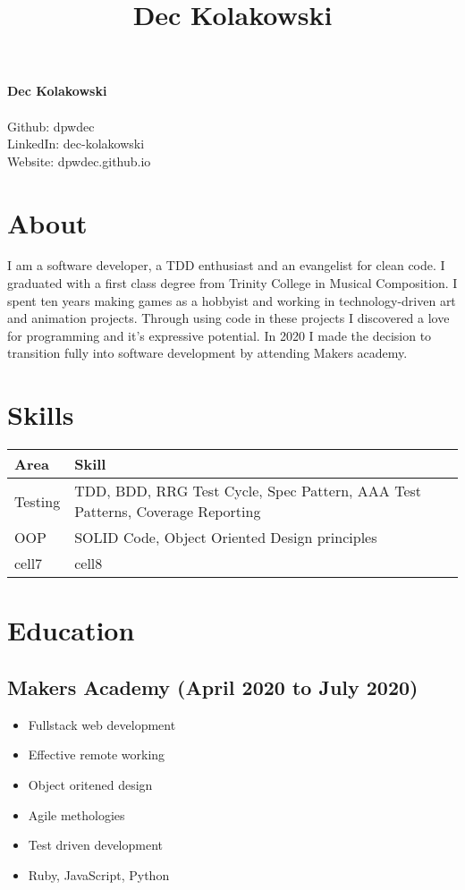 \documentclass[12pt]{IEEEtran}
\begin{document}
\LARGE
\noindent
\title{Dec Kolakowski}
\textbf{Dec Kolakowski}
\small
\\
\\
Github: dpwdec
\\
LinkedIn: dec-kolakowski
\\
Website: dpwdec.github.io
\\

\section*{About}

I am a software developer, a TDD enthusiast and an evangelist for clean code. I graduated with a first class degree from Trinity College in Musical Composition. I spent ten years making games as a hobbyist and working in technology-driven art and animation projects. Through using code in these projects I discovered a love for programming and it’s expressive potential. In 2020 I made the decision to transition fully into software development by attending Makers academy.

\section*{Skills}

\begin{center}
\begin{tabular}{ |l|l| } 
 \hline
 Area & Skill\\
 \hline\hline
 Testing & TDD, BDD, RRG Test Cycle, Spec Pattern, AAA Test Patterns, Coverage Reporting\\
 \hline
 OOP & SOLID Code, Object Oriented Design principles\\
 \hline
 cell7 & cell8\\
 \hline
\end{tabular}
\end{center}

\section*{Education}

\subsection*{Makers Academy (April 2020 to July 2020)}

\begin{itemize}
\item Fullstack web development
\item Effective remote working
\item Object oritened design
\item Agile methologies
\item Test driven development
\item Ruby, JavaScript, Python
\end{itemize}
\end{document}
